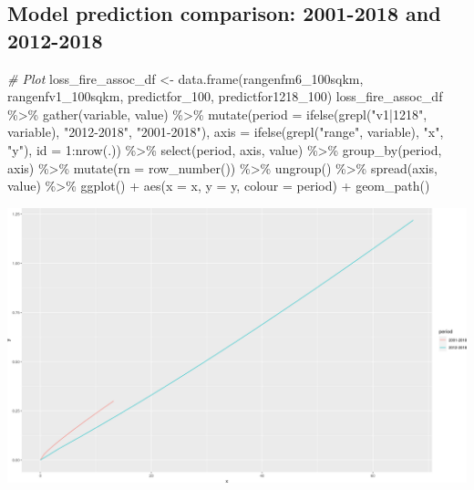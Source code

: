 \documentclass[10pt,landscape,a3paper]{article}
\newenvironment{Shaded}{\begin{snugshade}}{\end{snugshade}}
\newcommand{\AttributeTok}[1]{\textcolor[rgb]{0.77,0.63,0.00}{#1}}
\newcommand{\CommentTok}[1]{\textcolor[rgb]{0.56,0.35,0.01}{\textit{#1}}}
\newcommand{\DecValTok}[1]{\textcolor[rgb]{0.00,0.00,0.81}{#1}}
\newcommand{\FunctionTok}[1]{\textcolor[rgb]{0.00,0.00,0.00}{#1}}
\newcommand{\NormalTok}[1]{#1}
\newcommand{\OtherTok}[1]{\textcolor[rgb]{0.56,0.35,0.01}{#1}}
\newcommand{\SpecialCharTok}[1]{\textcolor[rgb]{0.00,0.00,0.00}{#1}}
\newcommand{\StringTok}[1]{\textcolor[rgb]{0.31,0.60,0.02}{#1}}
\begin{document}
\hypertarget{model-prediction-comparison-2001-2018-and-2012-2018}{%
\subsection{Model prediction comparison: 2001-2018 and
2012-2018}\label{model-prediction-comparison-2001-2018-and-2012-2018}}

\begin{Shaded}
\begin{Highlighting}[]
\CommentTok{\# Plot}
\NormalTok{loss\_fire\_assoc\_df }\OtherTok{\textless{}{-}} \FunctionTok{data.frame}\NormalTok{(rangenfm6\_100sqkm, rangenfv1\_100sqkm, predictfor\_100,}
\NormalTok{    predictfor1218\_100)}
\NormalTok{loss\_fire\_assoc\_df }\SpecialCharTok{\%\textgreater{}\%}
    \FunctionTok{gather}\NormalTok{(variable, value) }\SpecialCharTok{\%\textgreater{}\%}
    \FunctionTok{mutate}\NormalTok{(}\AttributeTok{period =} \FunctionTok{ifelse}\NormalTok{(}\FunctionTok{grepl}\NormalTok{(}\StringTok{"v1|1218"}\NormalTok{, variable), }\StringTok{"2012{-}2018"}\NormalTok{, }\StringTok{"2001{-}2018"}\NormalTok{),}
        \AttributeTok{axis =} \FunctionTok{ifelse}\NormalTok{(}\FunctionTok{grepl}\NormalTok{(}\StringTok{"range"}\NormalTok{, variable), }\StringTok{"x"}\NormalTok{, }\StringTok{"y"}\NormalTok{), }\AttributeTok{id =} \DecValTok{1}\SpecialCharTok{:}\FunctionTok{nrow}\NormalTok{(.)) }\SpecialCharTok{\%\textgreater{}\%}
    \FunctionTok{select}\NormalTok{(period, axis, value) }\SpecialCharTok{\%\textgreater{}\%}
    \FunctionTok{group\_by}\NormalTok{(period, axis) }\SpecialCharTok{\%\textgreater{}\%}
    \FunctionTok{mutate}\NormalTok{(}\AttributeTok{rn =} \FunctionTok{row\_number}\NormalTok{()) }\SpecialCharTok{\%\textgreater{}\%}
    \FunctionTok{ungroup}\NormalTok{() }\SpecialCharTok{\%\textgreater{}\%}
    \FunctionTok{spread}\NormalTok{(axis, value) }\SpecialCharTok{\%\textgreater{}\%}
    \FunctionTok{ggplot}\NormalTok{() }\SpecialCharTok{+} \FunctionTok{aes}\NormalTok{(}\AttributeTok{x =}\NormalTok{ x, }\AttributeTok{y =}\NormalTok{ y, }\AttributeTok{colour =}\NormalTok{ period) }\SpecialCharTok{+} \FunctionTok{geom\_path}\NormalTok{()}
\end{Highlighting}
\end{Shaded}

\begin{center}\includegraphics{img/modelling/lta-model-predictions-1} \end{center}
\end{document}
